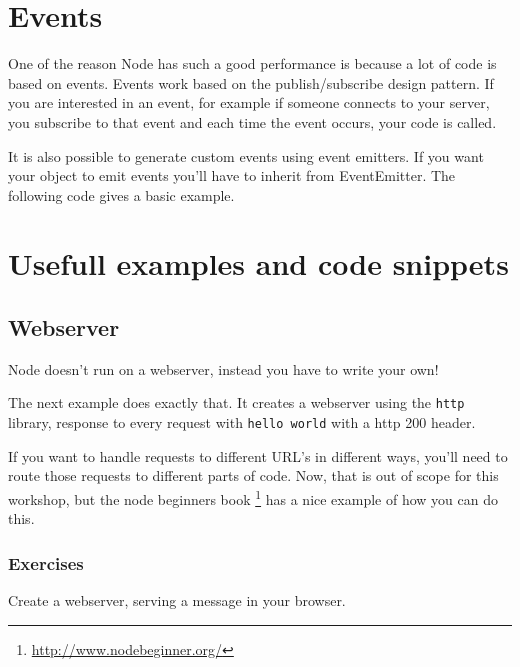 \documentclass[a4paper]{report}
\begin{document}
\section*{Events}
One of the reason Node has such a good performance is because a lot of code is based on events. Events work based on the publish/subscribe design pattern. If you are interested in an event, for example if someone connects to your server, you subscribe to that event and each time the event occurs, your code is called.



\noindent It is also possible to generate custom events using event emitters. If you want your object to emit events you'll have to inherit from EventEmitter. The following code gives a basic example.



\section*{Usefull examples and code snippets}

\subsection*{Webserver}
Node doesn't run on a webserver, instead you have to write your own! 

The next example does exactly that. It creates a webserver using the \texttt{http} library, response to every request with \texttt{hello world} with a http 200 header.



\noindent If you want to handle requests to different URL's in different ways, you'll need to route those requests to different parts of code. Now, that is out of scope for this workshop, but the node beginners book \footnote{\url{http://www.nodebeginner.org/}} has a nice example of how you can do this.

\subsubsection*{Exercises}
Create a webserver, serving a message in your browser.
\end{document}
